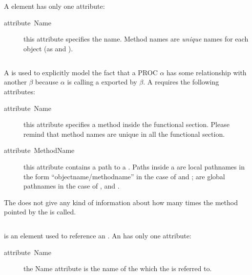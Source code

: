 A  element has only one attribute:
\begin{description}
\item [{attribute~Name}] this attribute specifies the 
  name. Method names are \emph{unique} names for each object (as
   and ).
\end{description}

\subsection{}
\label{sub:METHODREF}

A  is used to explicitly model the fact that a PROC
$\alpha$ has some relationship with another  $\beta$
because $\alpha$ is calling a  exported by $\beta$.  A
 requires the following attributes:
\begin{description}
\item [{attribute~Name}] this attribute specifies a method inside the
  functional section. Please remind that method names are unique in
  all the functional section.
\item [{attribute~MethodName}] this attribute contains a path to a
  .  Paths inside a  are local
  pathnames in the form {}``objectname/methodname'' in the case of
   and ; are global pathnames
  in the case of , and .
\end{description}
The  does not give any kind of information about how
many times the method pointed by the  is called.


\subsection{}
\label{sub:EVENTREF}

 is an element used to reference an .  An
 has only one attribute:
\begin{description}
\item [{attribute~Name}] the Name attribute is the name of the
   which the  is referred to.
\end{description}

\subsection{}
\label{sub:MUTEXREF}

